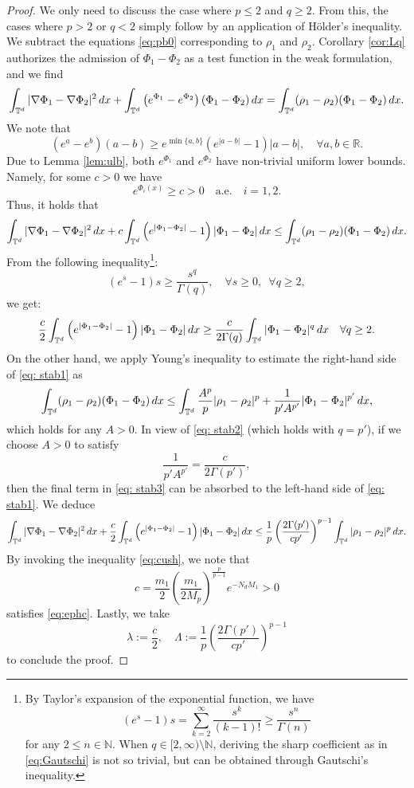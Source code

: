 \documentclass[11pt,reqno,a4paper]{amsart}
\newcommand{\N}{\mathbb{N}}
\newcommand{\R}{\mathbb{R}}
\newcommand{\intt}{\int_{\T^d}}
\theoremstyle{definition}
\theoremstyle{remark}
\numberwithin{equation}{section}
\newcommand{\T} {\mathbb T}
\newcommand{\lt}{\left}
\newcommand{\rt}{\right}
\newcommand{\bq}{\begin{equation}}
\newcommand{\eq}{\end{equation}}
\newcommand{\dx}{\textnormal{d}x}
\begin{document}
\begin{proof}
We only need to discuss the case where $p\le 2$ and $q\ge2$. From this, the cases where $p>2$ or $q<2$ simply follow by an application of H\"older's inequality. We subtract the equations \eqref{eq:pb0} corresponding to $\rho_1$ and $\rho_2$. Corollary \ref{cor:Lq} authorizes the admission of $\Phi_1 - \Phi_2$ as a test function in the weak formulation, and we find
\[
\intt |\nabla \Phi_1 - \nabla \Phi_2|^2 \,\dx + \intt \lt(e^{\Phi_1}-e^{\Phi_2}\rt)(\Phi_1 -\Phi_2) \,\dx = \intt (\rho_1 - \rho_2)(\Phi_1 -\Phi_2)\,\dx.
\]
We note that
\[
\lt(e^{a}-e^{b}\rt)(a-b) \ge e^{\min\{a,b\}}(e^{|a-b|}-1)|a-b|,\quad \forall a,b \in\R.
\]
Due to Lemma \ref{lem:ulb}, both $e^{\Phi_1}$ and $e^{\Phi_2}$ have non-trivial uniform lower bounds. Namely, for some $c>0$ we have  
\bq\label{eq:ephc}
e^{\Phi_i(x)} \ge c>0 \quad \text{a.e.} \quad i=1,2.
\eq
Thus, it holds that
\begin{equation}
\label{eq: stab1}
\intt |\nabla \Phi_1 - \nabla \Phi_2|^2 \,\dx + c\intt \lt(e^{|\Phi_1 -\Phi_2|}-1\rt)|\Phi_1 -\Phi_2| \, \dx \le  \intt (\rho_1 - \rho_2)(\Phi_1 -\Phi_2)\,\dx.
\end{equation}
From the following inequality\footnote{By Taylor's expansion of the exponential function, we have
\[
\displaystyle (e^s-1)s =\sum_{k=2}^{\infty} \frac{s^k}{(k-1)!} \ge \frac{s^n}{\Gamma(n)}
\]
for any $2\le n\in \N$. When $q \in [2,\infty)\setminus \N$, deriving the sharp coefficient as in \eqref{eq:Gautschi} is not so trivial, but can be obtained through Gautschi's inequality.
}:
\bq\label{eq:Gautschi}
(e^{s}-1)s \ge \frac{s^q}{\Gamma(q)},\quad \forall s\ge0,\,\,\, \forall q \ge 2,
\eq
we get:
\begin{equation}
\label{eq: stab2}
\frac{c}{2}\intt \lt(e^{|\Phi_1 -\Phi_2|}-1\rt)|\Phi_1 -\Phi_2| \, \dx \ge \frac{c}{2\Gamma(q)} \intt |\Phi_1 -\Phi_2|^q\,\dx \quad \forall q\ge 2.
\end{equation}
On the other hand, we apply Young's inequality to estimate the right-hand side of \eqref{eq: stab1} as
\begin{equation}
\label{eq: stab3}
 \intt (\rho_1 - \rho_2)(\Phi_1 -\Phi_2) \,\dx \le \intt \frac{A^p}{p}|\rho_1-\rho_2|^p + \frac{1}{p'A^{p'}}|\Phi_1-\Phi_2|^{p'}\, \dx,
\end{equation}
which holds for any $A>0$. In view of \eqref{eq: stab2} (which holds with $q=p'$), if we choose $A>0$ to satisfy
\[
\frac{1}{p'A^{p'}} =\frac{c}{2\Gamma(p')},
\]
then the final term in \eqref{eq: stab3} can be absorbed to the left-hand side of \eqref{eq: stab1}. We deduce
\[
\intt |\nabla \Phi_1 - \nabla \Phi_2|^2 \,\dx + \frac{c}{2}\intt \lt(e^{|\Phi_1 -\Phi_2|}-1\rt)|\Phi_1 -\Phi_2|  \, \dx \le \frac{1}{p}\lt(\frac{2\Gamma(p')}{cp'}\rt)^{p-1}\intt |\rho_1 - \rho_2|^p \,\dx.
\]
By invoking the inequality \eqref{eq:cush}, we note that
\[
c=\frac{m_1}{2}\lt(\frac{m_1}{2M_p}\rt)^{\frac{p}{p-1}}e^{-N_d M_1} >0
\]
satisfies \eqref{eq:ephc}. Lastly, we take 
\[
\lambda :=\frac{c}{2},\quad \Lambda := \frac{1}{p}\lt(\frac{2\Gamma(p')}{cp'}\rt)^{p-1}
\]
to conclude the proof.
\end{proof}
\end{document}
